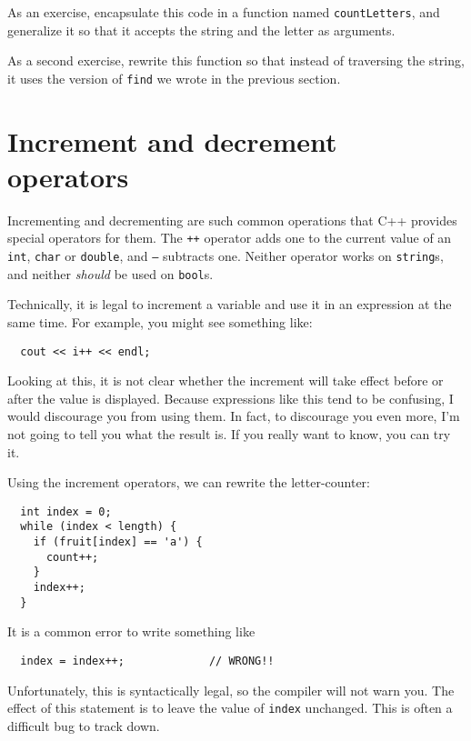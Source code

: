 
As an exercise, encapsulate this code in a function named
{\tt countLetters}, and generalize it so that it accepts the
string and the letter as arguments.


As a second exercise, rewrite this function so that instead
of traversing the string, it uses the version of
{\tt find} we wrote in the previous section.

\section{Increment and decrement operators}

Incrementing and decrementing are such common operations that C++
provides special operators for them.  The {\tt ++} operator adds one
to the current value of an {\tt int}, {\tt char} or {\tt double}, and
{\tt --} subtracts one.  Neither operator works on {\tt string}s,
and neither {\em should} be used on {\tt bool}s.

Technically, it is legal to increment a variable and use it
in an expression at the same time.  For example, you might see
something like:

\begin{lstlisting}
  cout << i++ << endl;
\end{lstlisting}
%
Looking at this, it is not clear whether the increment will
take effect before or after the value is displayed.  Because
expressions like this tend to be confusing, I would discourage
you from using them.  In fact, to discourage you even more,
I'm not going to tell you what the result is.  If you really
want to know, you can try it.

Using the increment operators, we can rewrite the letter-counter:

\begin{lstlisting}
  int index = 0;
  while (index < length) {
    if (fruit[index] == 'a') {
      count++;
    }
    index++;
  }
\end{lstlisting}
%
It is a common error to write something like

\begin{lstlisting}
  index = index++;             // WRONG!!
\end{lstlisting}
%
Unfortunately, this is syntactically legal, so the compiler
will not warn you.  The effect of this statement is to leave
the value of {\tt index} unchanged.  This is often a difficult
bug to track down.


